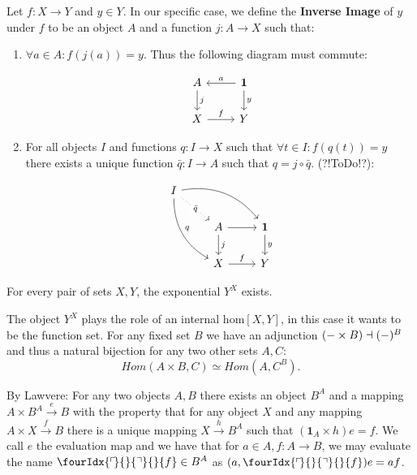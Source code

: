 \begin{definition}[$\dagger$]
Let $f: X \longrightarrow Y$ and $y \in Y$. In our specific case, we define the \textbf{Inverse Image} of $y$ under $f$ to be an object $A$ and a function $j:A \longrightarrow X$ such that:
\begin{enumerate}
\item $\forall a \in A: f(j(a)) = y$. Thus the following diagram must commute:

\begin{equation*}
\begin{tikzcd}
A \arrow[d, "j"]
& \mathbf{1} \arrow[d, "y"] \arrow[l, "a", swap] \\
 X \arrow[r, "f"]
& Y
\end{tikzcd}
\end{equation*}

\item For all objects $I$ and functions $q: I \longrightarrow X$ such that $\forall t \in I: f(q(t)) = y$ there exists a unique function $\bar{q}: I \longrightarrow A$ such that $q = j \circ \bar{q}$. (?!ToDo!?): 

\begin{equation*}
\begin{tikzcd}
I
\arrow[drr, bend left, ""]
\arrow[ddr, bend right, "q"]
\arrow[dr, dotted, "{\bar{q}}" description] & & \\
& A \arrow[r, ""] \arrow[d, "j"]
& \mathbf{1} \arrow[d, "y"] \\
& X \arrow[r, "f"]
& Y
\end{tikzcd}
\end{equation*}


\end{enumerate}
\end{definition}

\begin{axiom}
For every pair of sets $X, Y$, the exponential $Y^X$ exists.
\end{axiom}

\begin{remark}[$\dagger$]
The object $Y^X$ plays the role of an internal hom$[X,Y]$, in this case it wants to be the function set. For any fixed set $B$ we have an adjunction $(\-- \times B) \dashv (\--)^B$ and thus a natural bijection for any two other sets $A,C$:
\begin{equation*}
Hom(A \times B, C) \simeq Hom(A, C^B).
\end{equation*}

By Lawvere: For any two objects $A, B$ there exists an object $B^A$ and a mapping $A \times B^A \xrightarrow{e} B$ with the property that for any object $X$ and any mapping $A \times X\xrightarrow{f} B$ there is a unique mapping $X \xrightarrow{h} B^A$ such that $(\mathbf{1}_A \times h)e = f$. We call $e$ the evaluation map and we have that for $a \in A, f:A\longrightarrow B$, we may evaluate the name $\fourIdx{\ulcorner\mkern-3mu}{}{\urcorner}{}{f} \in B^A$ as $(a,\fourIdx{\ulcorner\mkern-3mu}{}{\urcorner}{}{f})e = af$.

\end{remark}




